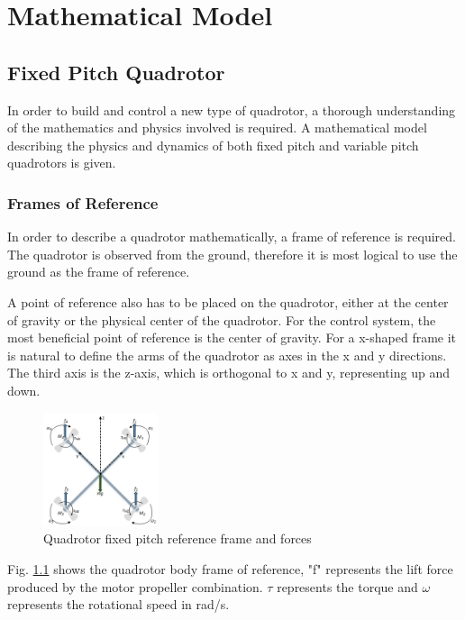 \chapter{Mathematical Model}
\section{Fixed Pitch Quadrotor}

In order to build and control a new type of quadrotor, a thorough understanding of the mathematics and physics involved is required. A mathematical model describing the physics and dynamics of both fixed pitch and variable pitch quadrotors is given.

\subsection{Frames of Reference}
In order to describe a quadrotor mathematically, a frame of reference is required. The quadrotor is observed from the ground, therefore it is most logical to use the ground as the frame of reference.\bigskip

A point of reference also has to be placed on the quadrotor, either at the center of gravity or the physical center of the quadrotor. For the control system, the most beneficial point of reference is the center of gravity. For a x-shaped frame it is natural to define the arms of the quadrotor as axes in the x and y directions. The third axis is the z-axis, which is orthogonal to x and y, representing up and down. \bigskip

\begin{figure}[H]
    \centering
    \includegraphics[width = 0.3\textwidth]{VAPIQ-PICTURES/MMFPQ.jpg}
    \caption{Quadrotor fixed pitch reference frame and forces}
    \label{fig:quadDynamics}
\end{figure}
\noindent
Fig. \ref{fig:quadDynamics} shows the quadrotor body frame of reference, "f" represents the lift force produced by the motor propeller combination. $\tau$ represents the torque and $\omega$ represents the rotational speed in rad/s.\bigskip

